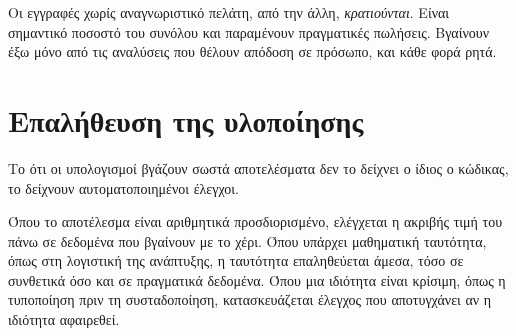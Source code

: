 Οι εγγραφές χωρίς αναγνωριστικό πελάτη, από την άλλη, \emph{κρατιούνται}. Είναι
σημαντικό ποσοστό του συνόλου και παραμένουν πραγματικές πωλήσεις. Βγαίνουν έξω
μόνο από τις αναλύσεις που θέλουν απόδοση σε πρόσωπο, και κάθε φορά ρητά.

\section{Επαλήθευση της υλοποίησης}

Το ότι οι υπολογισμοί βγάζουν σωστά αποτελέσματα δεν το δείχνει ο ίδιος ο
κώδικας, το δείχνουν αυτοματοποιημένοι έλεγχοι.

Όπου το αποτέλεσμα είναι αριθμητικά προσδιορισμένο, ελέγχεται η ακριβής τιμή
του πάνω σε δεδομένα που βγαίνουν με το χέρι. Όπου υπάρχει μαθηματική ταυτότητα,
όπως στη λογιστική της ανάπτυξης, η ταυτότητα επαληθεύεται άμεσα, τόσο σε συνθετικά
όσο και σε πραγματικά δεδομένα. Όπου μια ιδιότητα είναι κρίσιμη, όπως η
τυποποίηση πριν τη συσταδοποίηση, κατασκευάζεται έλεγχος που αποτυγχάνει αν η
ιδιότητα αφαιρεθεί.
